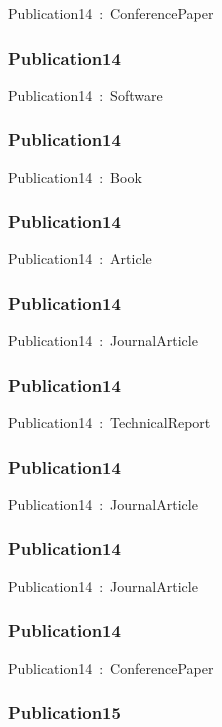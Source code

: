 \documentclass{article}
\begin{document}
Publication14~:~ConferencePaper

\subsubsection*{Publication14}

Publication14~:~Software

\subsubsection*{Publication14}

Publication14~:~Book

\subsubsection*{Publication14}

Publication14~:~Article

\subsubsection*{Publication14}

Publication14~:~JournalArticle

\subsubsection*{Publication14}

Publication14~:~TechnicalReport

\subsubsection*{Publication14}

Publication14~:~JournalArticle

\subsubsection*{Publication14}

Publication14~:~JournalArticle

\subsubsection*{Publication14}

Publication14~:~ConferencePaper

\subsubsection*{Publication15}
\end{document}
